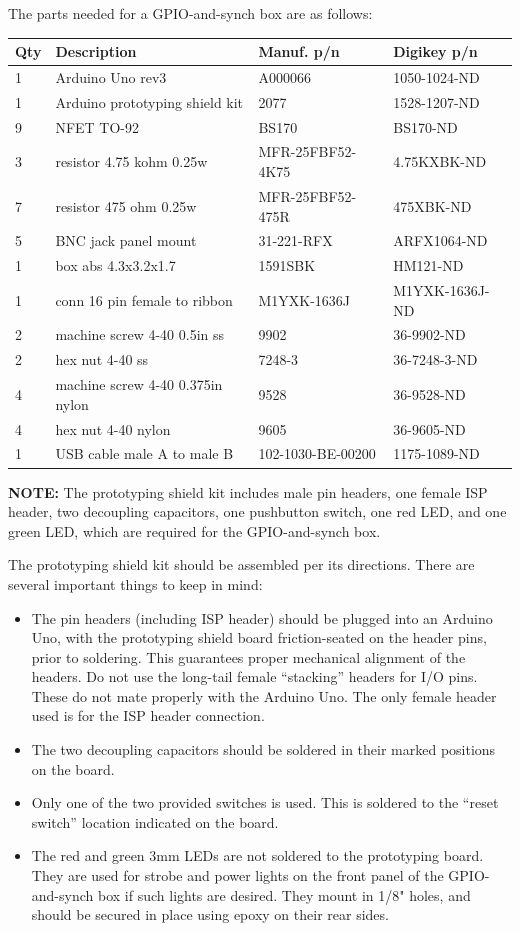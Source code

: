 \clearpage
The parts needed for a GPIO-and-synch box are as follows:

\begin{tabular}{llll}\hline
Qty & Description & Manuf. p/n & Digikey p/n \\
\hline
%
1 & Arduino Uno rev3 & A000066 & 1050-1024-ND \\
1 & Arduino prototyping shield kit & 2077 & 1528-1207-ND \\
9 & NFET TO-92 & BS170 & BS170-ND \\
3 & resistor 4.75 kohm 0.25w & MFR-25FBF52-4K75 & 4.75KXBK-ND \\
7 & resistor 475 ohm 0.25w & MFR-25FBF52-475R & 475XBK-ND \\
5 & BNC jack panel mount & 31-221-RFX & ARFX1064-ND \\
1 & box abs 4.3x3.2x1.7 & 1591SBK & HM121-ND \\
1 & conn 16 pin female to ribbon & M1YXK-1636J & M1YXK-1636J-ND \\
2 & machine screw 4-40 0.5in ss & 9902 & 36-9902-ND \\
2 & hex nut 4-40 ss & 7248-3 & 36-7248-3-ND \\
4 & machine screw 4-40 0.375in nylon & 9528 & 36-9528-ND \\
4 & hex nut 4-40 nylon & 9605 & 36-9605-ND \\
1 & USB cable male A to male B & 102-1030-BE-00200 & 1175-1089-ND \\
%
\hline
\end{tabular}

\textbf{NOTE:} The prototyping shield kit includes male pin headers,
one female ISP header, two decoupling capacitors, one pushbutton switch,
one red LED, and one green LED, which are required for the GPIO-and-synch
box.

The prototyping shield kit should be assembled per its directions. There are
several important things to keep in mind:
\begin{itemize}
%
\item The pin headers (including ISP header) should be plugged into an
Arduino Uno, with the prototyping shield board friction-seated on the header
pins, prior to soldering. This guarantees proper mechanical alignment of the
headers.
%
Do not use the long-tail female ``stacking'' headers for I/O pins. These
do not mate properly with the Arduino Uno. The only female header used is
for the ISP header connection.
%
\item The two decoupling capacitors should be soldered in their marked
positions on the board.
%
\item Only one of the two provided switches is used. This is soldered to
the ``reset switch'' location indicated on the board.
%
\item The red and green 3mm LEDs are not soldered to the prototyping board.
They are used for strobe and power lights on the front panel of the
GPIO-and-synch box if such lights are desired. They mount in 1/8" holes,
and should be secured in place using epoxy on their rear sides.
%
\end{itemize}

